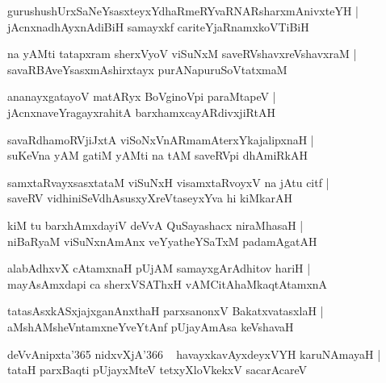\documentclass[twoside,12pt,openright]{book}
\newcounter{shloka}[chapter]
\begin{document}
\begin{shloka}%
gurushushUrxSaNeYsasxteyxYdhaRmeRYvaRNARsharxmAnivxteYH |\\
jAcnxnadhAyxnAdiBiH samayxkf cariteYjaRnamxkoVTiBiH
\end{shloka}

\begin{shloka}%
na yAMti tatapxram sherxVyoV viSuNxM saveRVshavxreVshavxraM |\\
savaRBAveYsasxmAshirxtayx purANapuruSoVtatxmaM
\end{shloka}

\begin{shloka}%
ananayxgatayoV matARyx BoVginoVpi paraMtapeV |\\
jAcnxnaveYragayxrahitA barxhamxcayARdivxjiRtAH
\end{shloka}

\begin{shloka}%
savaRdhamoRVjiJxtA viSoNxVnARmamAterxYkajalipxnaH |\\
suKeVna yAM gatiM yAMti na tAM saveRVpi dhAmiRkAH 
\end{shloka}

\begin{shloka}%
samxtaRvayxsasxtataM viSuNxH visamxtaRvoyxV na jAtu citf |\\
saveRV vidhiniSeVdhAsusxyXreVtaseyxYva hi kiMkarAH
\end{shloka}

\begin{shloka}%
kiM tu barxhAmxdayiV deVvA QuSayashacx niraMhasaH |\\
niBaRyaM viSuNxnAmAnx veYyatheYSaTxM padamAgatAH 
\end{shloka}

\begin{shloka}%
alabAdhxvX cAtamxnaH pUjAM samayxgArAdhitov hariH |\\
mayAsAmxdapi ca sherxVSAThxH vAMCitAhaMkaqtAtamxnA 
\end{shloka}

\begin{shloka}%
tatasAsxkASxjajxganAnxthaH parxsanonxV BakatxvatasxlaH |\\
aMshAMsheVntamxneYveYtAnf pUjayAmAsa keVshavaH
\end{shloka}

\begin{shloka}%
deVvAnipxta\char'365 nidxvXjA\char'366 ~ havayxkavAyxdeyxVYH karuNAmayaH |\\
tataH parxBaqti pUjayxMteV tetxyXloVkekxV sacarAcareV 
\end{shloka}
\end{document}
